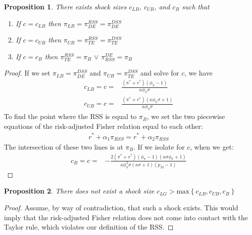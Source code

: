 \documentclass[11pt]{article}
\newtheorem{proposition}{Proposition}
\begin{document}
\begin{singlespace}
		\begin{proposition}\label{prop:cSHOCKS}
			There exists shock sizes $c_{LB}$, $c_{UB}$, and $c_{B}$ such that 
			\begin{enumerate}
				\item [i.] If $c = c_{LB}$ then $\pi_{LB} = \pi^{RSS}_{DE} = \pi^{DSS}_{DE}$ 
				\item [ii.] If $c = c_{UB}$ then $\pi_{UB} = \pi^{RSS}_{TE} = \pi^{DSS}_{TE}$
				\item [iii.] If $c = c_{B}$ then $\pi^{RSS}_{TE} = \pi_B$ $\lor$ $\pi_{RSS}^{DE} = \pi_B$
			\end{enumerate}
		\end{proposition}
		\begin{proof}
			If we set $\pi_{LB} = \pi^{DSS}_{DE}$ and $\pi_{UB} = \pi^{DSS}_{TE}$ and solve for $c$, we have 
			\begin{align*}
			c_{LB} = c = &\frac{(\pi^*+r^* )(\phi_{\pi} - 1)}{\kappa\phi_{\pi}\sigma}\\
			c_{UB} = c = &\frac{(\pi^* + r^*) (\kappa\phi_{\pi}\sigma  + 1)}{\kappa\phi_{\pi}\sigma}
			\end{align*}
			To find the point where the RSS is equal to $\pi_{B} $, we set the two piecewise equations of the risk-adjusted Fisher relation equal to each other:
			\begin{align*}
			r^* + \alpha_1\pi_{RSS} = r^* + \alpha_2\pi_{RSS}
			\end{align*}
			The intersection of these two lines is at $\pi_{B}$. If we isolate for $c$, when we get: 
			\begin{align*}
			c_{B} = c = &-\frac{2(\pi^* + r^*)(\phi_{\pi}-1)(\kappa\sigma\phi_{\pi}+1)} {\kappa\phi_{\pi}^2\sigma(\kappa\sigma+1)(p_M-1)}
			\end{align*}
		\end{proof}
		\begin{proposition}
			There does not exist a shock size $c_{LG} > \text{max}\left\{c_{LB}, c_{UB}, c_{B}\right\}$
		\end{proposition}
		\begin{proof}
			Assume, by way of contradiction, that such a shock exists. This would imply that the risk-adjusted Fisher relation does not come into contact with the Taylor rule, which violates our definition of the RSS. 
		\end{proof}	
		

\end{singlespace}
\end{document}
